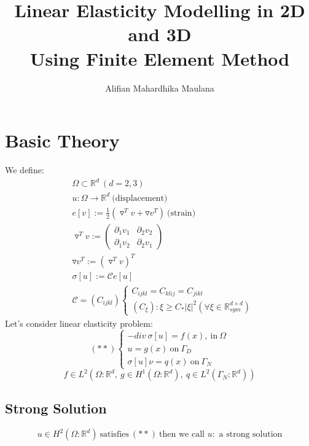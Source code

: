 \documentclass[a4paper,11pt]{article}
\title{Linear Elasticity Modelling in 2D and 3D\\ Using Finite Element Method}
\author{Alifian Mahardhika Maulana}
\newcommand{\R}{\mathbb{R}}
\newcommand{\Cmod}{\mathcal{C}}
\begin{document}
\maketitle
\section{Basic Theory}
We define:
\begin{equation*}
\begin{aligned}
&\Omega \subset \R^d\ (d=2,3)\\
&u:\Omega \rightarrow \R^d\ \text{(displacement)}\\
&e[v]:= \frac{1}{2}(\triangledown^T v + \triangledown v^T)\ \text{(strain)}\\
&\triangledown^T v := \begin{pmatrix}
\partial_1 v_1 & \partial_2 v_2\\
\partial_1 v_2 & \partial_2 v_1
\end{pmatrix}\\
& \triangledown v^T := ( \triangledown^T v)^T\\
&\sigma[u]:=\Cmod e[u]\\
&\Cmod=(C_{ijkl})\begin{cases}
C_{ijkl}=C_{klij}=C_{jikl}\\
(C_\xi):\xi \geq C_* |\xi|^2 (\forall \xi \in \R_{sym}^{d\times d})
\end{cases}
\end{aligned}
\end{equation*}
Let's consider linear elasticity problem:
\begin{equation}\label{linearelcase}
(**)\begin{cases}
-div\ \sigma[u]=f(x),\ \text{in}\ \Omega\\
u=g(x)\ \text{on}\ \Gamma_D\\
\sigma[u] \nu = q(x)\ \text{on}\ \Gamma_N
\end{cases}
\end{equation}
\begin{equation*}
f \in L^2(\Omega : \R^d,\ g\in H^1(\Omega : \R^d),\ q\in L^2(\Gamma_N:\R^d))
\end{equation*}
\subsection{Strong Solution}
\begin{equation*}
u\in H^2 (\Omega : \R^d)\ \text{satisfies}\ (**)\ \text{then we call $u:$ a strong solution}
\end{equation*}
\end{document}

